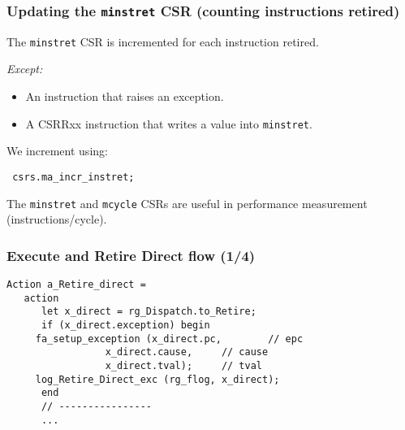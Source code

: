 \begin{frame}[fragile]
\frametitle{Updating the {\tt minstret} CSR (counting instructions retired)}

\footnotesize

The {\tt minstret} CSR is incremented for each instruction retired.

\emph{Except:}

\begin{itemize}

 \item An instruction that raises an exception.

 \item A CSRRxx instruction that writes a value into {\tt minstret}.

\end{itemize}

\vspace{2ex}

We increment using:
\begin{tabbing}\tt
\hmm  csrs.ma\_incr\_instret;
\end{tabbing}

\vspace{2ex}

The {\tt minstret} and {\tt mcycle} CSRs are useful in performance
measurement (instructions/cycle).

\end{frame}


\begin{frame}[fragile]
\frametitle{Execute and Retire Direct flow (1/4)}

\footnotesize

\begin{minipage}{0.725\textwidth}
\begin{Verbatim}[frame=single, label=From src\_Drum/CPU.bsv]
   Action a_Retire_direct =
   action
      let x_direct = rg_Dispatch.to_Retire;
      if (x_direct.exception) begin
	 fa_setup_exception (x_direct.pc,        // epc
			     x_direct.cause,     // cause
			     x_direct.tval);     // tval
	 log_Retire_Direct_exc (rg_flog, x_direct);
      end
      // ----------------
      ...
\end{Verbatim}
\end{minipage}

\end{frame}


